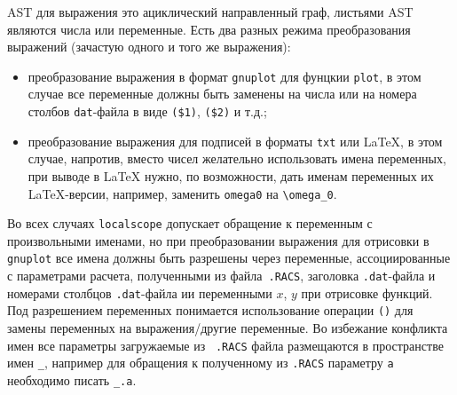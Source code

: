 \documentclass[12pt]{article}
\def\gnuplot{{\tt gnuplot}}
\begin{document}
AST для выражения это ациклический направленный граф, листьями AST являются числа или переменные. 
Есть два разных режима преобразования выражений (зачастую одного и того же выражения):
\begin{itemize}
\item преобразование выражения в формат \gnuplot{} для фунцкии \verb'plot',  в этом случае все переменные должны быть заменены на числа
  или на номера столбов \verb'dat'-файла  в виде \verb'($1)', \verb'($2)' и т.д.;
\item преобразование выражения для подписей в форматы \verb'txt' или \LaTeX{}, в этом случае, напротив, вместо чисел желательно использовать имена переменных,
 при выводе в \LaTeX{} нужно, по возможности, дать именам переменных их \LaTeX-версии, например, заменить \verb'omega0' на \verb'\omega_0'.
\end{itemize}
Во всех случаях \verb'localscope' допускает обращение к переменным с произвольными именами, но при преобразовании выражения
для отрисовки в \gnuplot{} все имена должны быть разрешены через переменные, ассоциированные с параметрами расчета, полученными из файла~\verb'.RACS',
заголовка \verb'.dat'-файла и номерами столбцов \verb'.dat'-файла ии переменными $x$, $y$ при отрисовке функций.
Под разрешением переменных понимается использование операции \verb'()' для замены переменных на выражения/другие переменные.
Во избежание конфликта имен все параметры загружаемые из ~\verb'.RACS' файла размещаются в пространстве имен \verb'_',
например для обращения к полученному из \verb'.RACS' параметру \verb'a' необходимо писать \verb'_.a'.
\end{document}
